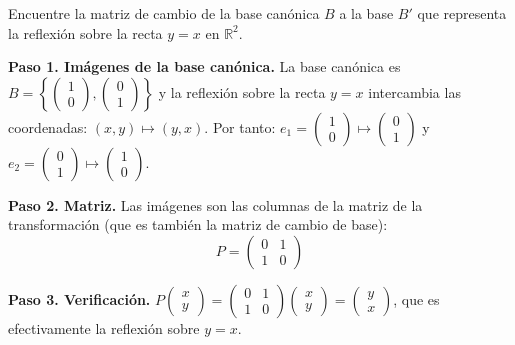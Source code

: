 \begin{prob} Encuentre la matriz de cambio de la base canónica $B$ a la base $B'$ que representa la reflexión sobre la recta $y=x$ en $\mathbb{R}^2$.

\begin{myproof}
\textbf{Paso 1. Imágenes de la base canónica.} La base canónica es $B = \left\{\begin{pmatrix}1\\0\end{pmatrix}, \begin{pmatrix}0\\1\end{pmatrix}\right\}$ y la reflexión sobre la recta $y=x$ intercambia las coordenadas: $(x,y) \mapsto (y,x)$. Por tanto: $e_1 = \begin{pmatrix}1\\0\end{pmatrix} \mapsto \begin{pmatrix}0\\1\end{pmatrix}$ y $e_2 = \begin{pmatrix}0\\1\end{pmatrix} \mapsto \begin{pmatrix}1\\0\end{pmatrix}$.

\textbf{Paso 2. Matriz.} Las imágenes son las columnas de la matriz de la transformación (que es también la matriz de cambio de base):
$$\boxed{P = \begin{pmatrix}0&1\\1&0\end{pmatrix}}$$

\textbf{Paso 3. Verificación.} $P\begin{pmatrix}x\\y\end{pmatrix} = \begin{pmatrix}0&1\\1&0\end{pmatrix}\begin{pmatrix}x\\y\end{pmatrix} = \begin{pmatrix}y\\x\end{pmatrix}$, que es efectivamente la reflexión sobre $y=x$.
\end{myproof}
\end{prob}

